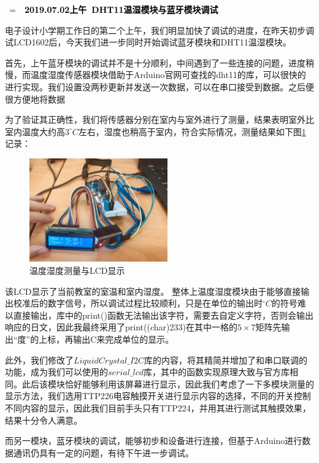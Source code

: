\documentclass[a4paper, 11pt]{article} %
\makeatletter
\newlength\sidebar
\newlength\envborder
\def\esefcolorbox#1#{\esecolor@fbox{#1}}
\def\esecolor@fbox#1#2#3{%
   \color@b@x{\fboxsep\z@\color#1{#2}\fboxs}{\color#1{#3}}}
\newenvironment{eseframed}{%
   \def\FrameCommand{\fboxrule=\the\sidebar  \fboxsep=\the\envborder%
   \esefcolorbox{exampleborder}{examplebg}}%
   \MakeFramed{\FrameRestore}}%
  {\endMakeFramed}
\newcounter{diary}
\newenvironment{diary}[2]
 {\par\medskip\refstepcounter{diary}%
 \hbox{%
 \fboxsep=\the\sidebar\hspace{-\envborder}\hspace{-0.5\sidebar}%
 \colorbox{exampleborder}{%
 \hspace{\envborder}\footnotesize\sffamily\bfseries%
 \textcolor{black}{{#1}\ {#2}\enspace\hspace{\envborder}}
 }
 }
 \nointerlineskip\vspace{-\topsep}%
 \begin{eseframed}\noindent\ignorespaces%
 }
 {\end{eseframed}\vspace{-\baselineskip}\medskip}
\makeatother
\begin{document}
\begin{diary}{2019.07.02上午}{DHT11温湿模块与蓝牙模块调试}
\par{}电子设计小学期工作日的第二个上午，我们明显加快了调试的进度，在昨天初步调试LCD1602后，今天我们进一步同时开始调试蓝牙模块和DHT11温湿模块。

首先，上午蓝牙模块的调试并不是十分顺利，中间遇到了一些连接的问题，进度稍慢，而温度湿度传感器模块借助于Arduino官网可查找的dht11的库，可以很快的进行实现。我们设置没两秒更新并发送一次数据，可以在串口接受到数据。之后便很方便地将数据

为了验证其正确性，我们将传感器分别在室内与室外进行了测量，结果表明室外比室内温度大约高$3^\circ C$左右，湿度也稍高于室内，符合实际情况，测量结果如下图\ref{img1}记录：
\begin{figure}[H]
  \centering
  \includegraphics[width = 0.53\textwidth]{temp1.jpg}
  \caption{温度湿度测量与LCD显示}
  \label{img1}
\end{figure}

该LCD显示了当前教室的室温和室内湿度。
整体上温度湿度模块由于能够直接输出校准后的数字信号，所以调试过程比较顺利，只是在单位的输出时$^{\circ}C$的符号难以直接输出，库中的print()函数无法输出该字符，需要去自定义字符，否则会输出响应的日文，因此我最终采用了print((char)233)在其中一格的$5\times 7$矩阵先输出“度”的上标，再输出C来完成单位的显示。

此外，我们修改了$LiquidCrystal\_I2C$库的内容，将其精简并增加了和串口联调的功能，成为我们可以使用的$serial\_lcd$库，其中的函数实现原理大致与官方库相同。此后该模块恰好能够利用该屏幕进行显示，因此我们考虑了一下多模块测量的显示方法，我们选用TTP226电容触摸开关进行显示内容的选择，不同的开关控制不同内容的显示，因此我们目前手头只有TTP224，并用其进行测试其触摸效果，结果十分令人满意。

而另一模块，蓝牙模块的调试，能够初步和设备进行连接，但基于Arduino进行数据通讯仍具有一定的问题，有待下午进一步调试。

\end{diary}
\end{document}
